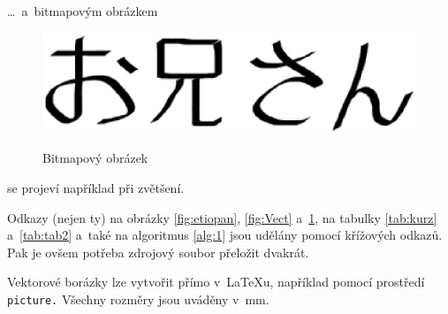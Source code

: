 \documentclass[11pt,a4paper,titlepage]{article}
\begin{document}
\ldots\, a~bitmapovým obrázkem \begin{figure}[ht]
\begin{center}
\scalebox{0.6}
{\includegraphics{oniisan2.eps}}
\caption{Bitmapový obrázek}
\label{fig:bitmap}
\end{center}
\end{figure}

\noindent se projeví například při zvětšení.

Odkazy (nejen ty) na obrázky \ref{fig:etiopan}, \ref{fig:Vect} a~\ref{fig:bitmap}, na tabulky \ref{tab:kurz} a~\ref{tab:tab2} a~také na algoritmus \ref{alg:1} jsou udělány pomocí křížových odkazů. Pak je ovšem potřeba zdrojový soubor přeložit dvakrát.

Vektorové borázky lze vytvořit přímo v~\LaTeX u, například pomocí prostředí \texttt{picture.} Všechny rozměry jsou uváděny v~mm.
\end{document}
